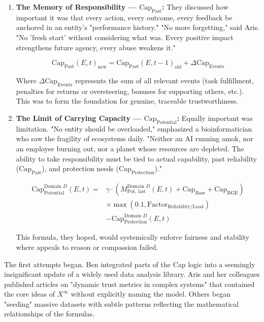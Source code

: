 \documentclass[12pt, english, parskip=full]{scrartcl} %
\begin{document}
\begin{enumerate}
    \item \textbf{The Memory of Responsibility — $\text{Cap}_{\text{Past}}$:}
    They discussed how important it was that every action, every outcome, every feedback be anchored in an entity’s "performance history." "No more forgetting," said Aris. "No 'fresh start' without considering what was. Every positive impact strengthens future agency, every abuse weakens it."

    $$ \text{Cap}_{\text{Past}}(E, t)_{\text{new}} = \text{Cap}_{\text{Past}}(E, t-1)_{\text{old}} + \Delta \text{Cap}_{\text{Events}} $$

    Where $\Delta \text{Cap}_{\text{Events}}$ represents the sum of all relevant events (task fulfillment, penalties for returns or oversteering, bonuses for supporting others, etc.). This was to form the foundation for genuine, traceable trustworthiness.

    \item \textbf{The Limit of Carrying Capacity — $\text{Cap}_{\text{Potential}}$:}
    Equally important was limitation. "No entity should be overloaded," emphasized a bioinformatician who saw the fragility of ecosystems daily. "Neither an AI running amok, nor an employee burning out, nor a planet whose resources are depleted. The ability to take responsibility must be tied to actual capability, past reliability ($\text{Cap}_{\text{Past}}$), and protection needs ($\text{Cap}_{\text{Protection}}$)."

    \begin{equation*}
    \begin{aligned}
    \text{Cap}_{\text{Potential}}^{\text{Domain } D}(E, t) ={} & \gamma \cdot (M_{\text{Pot, last}}^{\text{Domain } D}(E, t) + \text{Cap}_{\text{Base}} + \text{Cap}_{\text{BGE}}) \\
    & \times \max(0.1, \text{Factor}_{\text{Reliability/Load}}) \\
    & - \text{Cap}_{\text{Protection}}^{\text{Domain } D}(E, t)
    \end{aligned}
    \end{equation*}

    This formula, they hoped, would systemically enforce fairness and stability where appeals to reason or compassion failed.
\end{enumerate}

The first attempts began. Ben integrated parts of the Cap logic into a seemingly insignificant update of a widely used data analysis library. Aris and her colleagues published articles on "dynamic trust metrics in complex systems" that contained the core ideas of $X^{\infty}$ without explicitly naming the model. Others began "seeding" massive datasets with subtle patterns reflecting the mathematical relationships of the formulas.
\end{document}
